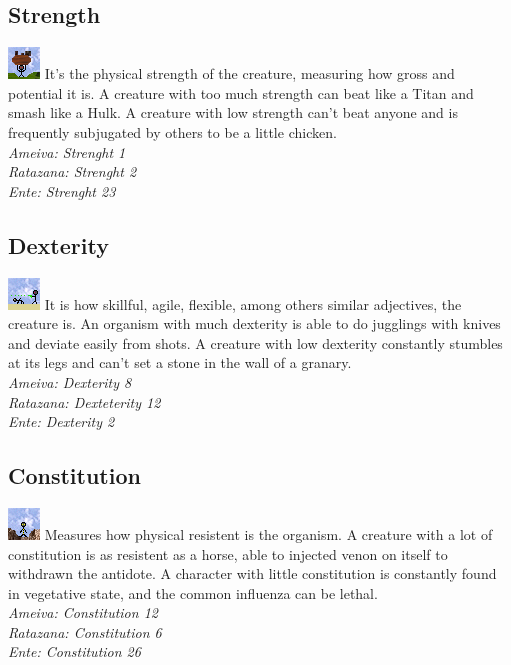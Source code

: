 \documentclass[ letterpaper,12pt]{article}
\begin{document}
\subsection{Strength}
\includegraphics{../data/skills/Img/forca.png}
It's the physical strength of the creature, measuring how gross and potential it is. A creature with too much strength can beat like a Titan and smash like a Hulk. A creature with low strength can't beat anyone and is frequently subjugated by others to be a little chicken.\\
{\it Ameiva: Strenght 1\\
Ratazana: Strenght 2\\
Ente: Strenght 23\\}

\subsection{Dexterity}
\includegraphics{../data/skills/Img/destreza.png}
It is how skillful, agile, flexible, among others similar adjectives, the creature is. An organism with much dexterity is able to do jugglings with knives and deviate easily from shots. A creature with low dexterity constantly stumbles at its legs and can't set a stone in the wall of a granary.\\
{\it Ameiva: Dexterity 8\\
Ratazana: Dexteterity 12\\
Ente: Dexterity 2}

\subsection{Constitution}
\includegraphics{../data/skills/Img/constituicao.png}
Measures how physical resistent is the organism. A creature with a lot of constitution is as resistent as a horse, able to injected venon on itself to withdrawn the antidote. A character with little constitution is constantly found in vegetative state, and the common influenza can be lethal.\\
{\it Ameiva: Constitution 12\\
Ratazana: Constitution 6\\
Ente: Constitution 26}
\end{document}
